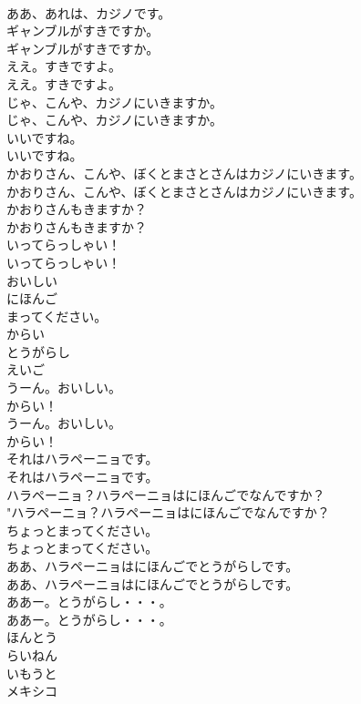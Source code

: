 \documentclass[8pt]{extreport}
\begin{document}
\begin{CJK}{UTF8}{min}
\\	ああ、あれは、カジノです。 
\\	ギャンブルがすきですか。	
\\	ギャンブルがすきですか。 
\\	ええ。すきですよ。	
\\	ええ。すきですよ。 
\\	じゃ、こんや、カジノにいきますか。	
\\	じゃ、こんや、カジノにいきますか。 
\\	いいですね。	
\\	いいですね。 
\\	かおりさん、こんや、ぼくとまさとさんはカジノにいきます。	
\\	かおりさん、こんや、ぼくとまさとさんはカジノにいきます。 
\\	かおりさんもきますか？	
\\	かおりさんもきますか？ 
\\	いってらっしゃい！	
\\	いってらっしゃい！ 
\\	おいしい
\\	にほんご
\\	まってください。
\\	からい
\\	とうがらし
\\	えいご
\\	うーん。おいしい。 
\\	からい！	
\\	うーん。おいしい。 
\\	からい！ 
\\	それはハラペーニョです。	
\\	それはハラペーニョです。 
\\	ハラペーニョ？ハラペーニョはにほんごでなんですか？	
\\	"ハラペーニョ？ハラペーニョはにほんごでなんですか？ 
\\	ちょっとまってください。	
\\	ちょっとまってください。 
\\	ああ、ハラペーニョはにほんごでとうがらしです。	
\\	ああ、ハラペーニョはにほんごでとうがらしです。 
\\	ああー。とうがらし・・・。	
\\	ああー。とうがらし・・・。 
\\	ほんとう
\\	らいねん
\\	いもうと
\\	メキシコ

\end{CJK}
\end{document}
